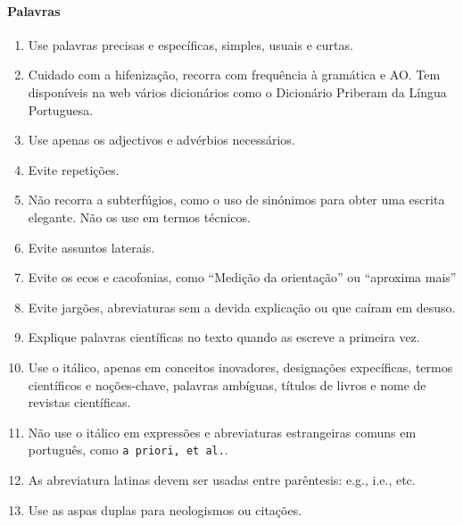 \paragraph{Palavras}
\begin{enumerate}
\item Use palavras precisas e específicas, simples, usuais e curtas.
\item Cuidado com a hifenização, recorra com frequência à gramática e AO. Tem disponíveis na web vários dicionários como o Dicionário Priberam da Língua Portuguesa.
\item Use apenas os adjectivos e advérbios necessários.
\item Evite repetições.
\item Não recorra a subterfúgios, como o uso de sinónimos para obter uma escrita elegante. Não os use em termos técnicos.
\item Evite assuntos laterais.
\item Evite os ecos e cacofonias, como ``Medição da orientação'' ou ``aproxima mais''
\item Evite jargões, abreviaturas sem a devida explicação ou que caíram em desuso.
\item Explique palavras científicas no texto quando as escreve a primeira vez.
\item Use o itálico, apenas em conceitos inovadores, designações expecíficas, termos científicos e noções-chave, palavras ambíguas, títulos de livros e nome de revistas científicas.
\item Não use o itálico em expressões e abreviaturas estrangeiras comuns em português, como \texttt{a priori, et al.}.
\item As abreviatura latinas devem ser usadas entre parêntesis: e.g., i.e., etc.
\item Use as aspas duplas para neologismos ou citações.
\end{enumerate}

